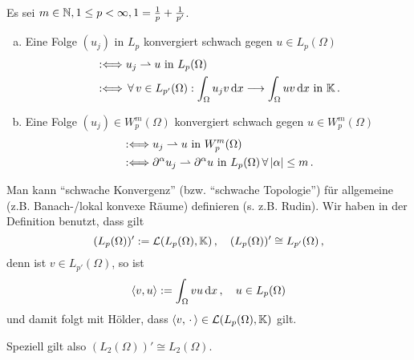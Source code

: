 \begin{defi}
Es sei $m\in \mathbb{N}, 1\leq p < \infty, 1 = \frac 1 p + \frac 1 {p'}$.
\begin{enumerate}[(a)]
\item Eine Folge $(u_j)$ in $L_p$ konvergiert schwach gegen $u \in L_p(\Omega)$
\begin{align*}
	&: \Longleftrightarrow u_j \rightharpoonup u \text{ in } L_p(\Omega) \\
	& : \Longleftrightarrow \, \forall \, v \in L_{p'}(\Omega) : \int_\Omega u_j v \,\mathrm{d} x \longrightarrow \int_\Omega uv \,\mathrm{d} x \text{ in } \mathbb{K} \, .
\end{align*}
\item Eine Folge $(u_j) \in W^m_p(\Omega)$ konvergiert schwach gegen $u \in W_p^m (\Omega)$
\begin{align*}
	& : \Longleftrightarrow u_j \rightharpoonup u \text{ in } W_p^m(\Omega) \\
	& : \Longleftrightarrow \partial^\alpha u_j \rightharpoonup \partial^\alpha u \text{ in } L_p(\Omega) \, \forall \, \lvert \alpha\rvert \leq m \, .
\end{align*}
\end{enumerate}
\end{defi}

\begin{bem}
Man kann "`schwache Konvergenz"' (bzw. "`schwache Topologie"') für allgemeine (z.B. Banach-/lokal konvexe Räume) definieren (s. z.B. Rudin). Wir haben in der Definition benutzt, dass gilt
\[
	(L_p(\Omega))' := \mathcal L(L_p(\Omega),\mathbb{K}) \, , \quad (L_p(\Omega))' \cong L_{p'} (\Omega) \, ,
\]
denn ist $v \in L_{p'} (\Omega)$, so ist
\[
	\langle v ,u\rangle := \int_\Omega vu \,\mathrm{d} x \, , \quad u \in L_p(\Omega) 
\]
und damit folgt mit Hölder, dass $\langle v, \, \cdot \, \rangle \in \mathcal L(L_p(\Omega), \mathbb{K})$ gilt.

Speziell gilt also $(L_2(\Omega))' \cong L_2(\Omega)$.
\end{bem}

